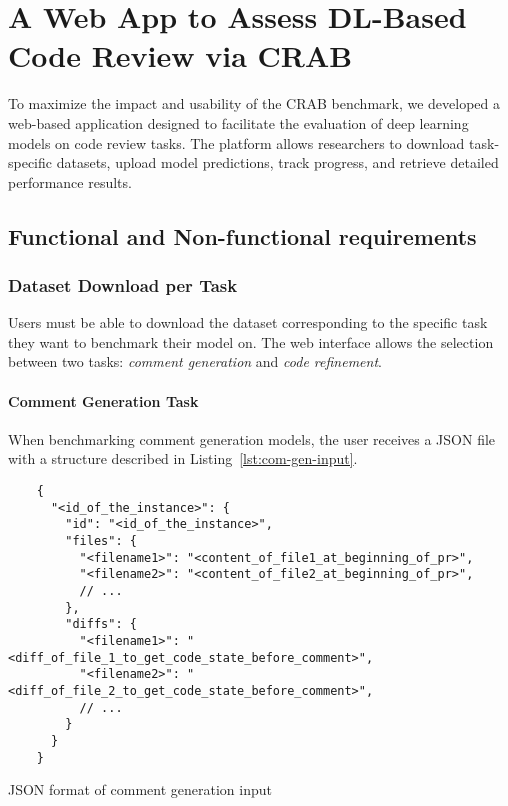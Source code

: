 \section{A Web App to Assess DL-Based Code Review via CRAB}
\label{sec:webapp}

To maximize the impact and usability of the CRAB benchmark, we developed a web-based application
designed to facilitate the evaluation of deep learning models on code review tasks. The platform
allows researchers to download task-specific datasets, upload model predictions, track progress, and
retrieve detailed performance results.

\subsection{Functional and Non-functional requirements}

%

\subsubsection{Dataset Download per Task}

Users must be able to download the dataset corresponding to the specific task they want to benchmark
their model on. The web interface allows the selection between two tasks: \emph{comment generation}
and \emph{code refinement}.

\paragraph{Comment Generation Task}

When benchmarking comment generation models, the user receives a JSON file with a structure
described in Listing~\ref{lst:com-gen-input}.

\begin{listing}[!ht]
	\begin{verbatim}
    {
      "<id_of_the_instance>": {
        "id": "<id_of_the_instance>",
        "files": {
          "<filename1>": "<content_of_file1_at_beginning_of_pr>",
          "<filename2>": "<content_of_file2_at_beginning_of_pr>",
          // ...
        },
        "diffs": {
          "<filename1>": "<diff_of_file_1_to_get_code_state_before_comment>",
          "<filename2>": "<diff_of_file_2_to_get_code_state_before_comment>",
          // ...
        }
      }
    }
    \end{verbatim}
	\caption{JSON format of comment generation input}
	\label{lst:com-gen-input}
\end{listing}

